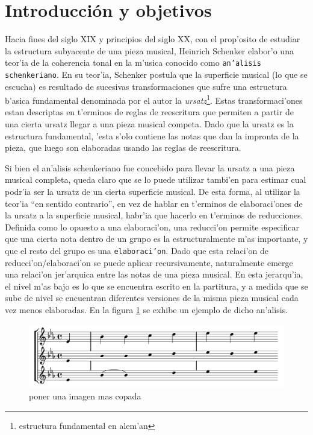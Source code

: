 \section{Introducci\'on y objetivos}
Hacia fines del siglo XIX y principios del siglo XX, con el prop'osito de estudiar la estructura subyacente de una pieza musical, 
Heinrich Schenker elabor'o una teor'ia de la coherencia tonal en la m'usica conocido como \texttt{an'alisis schenkeriano}.
En su teor'ia, Schenker postula que la superficie musical (lo que se escucha) es resultado de sucesivas transformaciones que sufre una estructura b'asica fundamental 
denominada por el autor la \emph{ursatz}\footnote{estructura fundamental en alem'an}. Estas transformaci'ones estan descriptas en t'erminos de reglas de reescritura que permiten 
a partir de una cierta ursatz llegar a una pieza musical competa. Dado que la ursatz es la estructura fundamental, 'esta s'olo contiene las notas que dan la impronta de la pieza, 
que luego son elaboradas usando las reglas de reescritura.

Si bien el an'alisis schenkeriano fue concebido para llevar la ursatz a una pieza musical completa, queda claro que se lo puede utilizar tambi'en para estimar
cual podr'ia ser la ursatz de un cierta superficie musical. De esta forma, al utilizar la teor'ia ``en sentido contrario'', en vez de hablar en t'erminos de elaboraci'ones de 
la ursatz a la superficie musical, habr'ia que hacerlo en t'erminos de reducciones. Definida como lo opuesto a una elaboraci'on, una reducci'on permite especificar que una cierta 
nota dentro de un grupo es la estructuralmente m'as importante, y que el resto del grupo es una \texttt{elaboraci'on}. 
Dado que esta relaci'on de reducci'on/elaboraci'on se puede aplicar recursivamente, naturalmente emerge una relaci'on 
jer'arquica entre las notas de una pieza musical.  En esta jerarqu'ia, el nivel m'as bajo es lo que se encuentra escrito en la partitura, y a medida que se sube de nivel se 
encuentran diferentes versiones de la misma pieza musical cada vez menos elaboradas. En la figura \ref{fig_analisis_schenkeriano} se exhibe un ejemplo de dicho an'alisis.


\begin{figure}[h]
\begin{center}
\includegraphics[width=12cm]{images/schenkerian_example}
\label{fig_analisis_schenkeriano}
\newline \alert{poner una imagen mas copada}
\end{center}
\end{figure}

